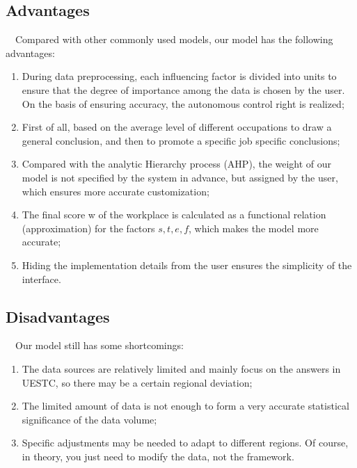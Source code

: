 \documentclass[12pt]{article}
\begin{document}
    \subsection{Advantages}
    ~~Compared with other commonly used models, our model has the following advantages:
    \begin{enumerate}
        \item During data preprocessing, each influencing factor is divided into units to ensure that the degree of importance among the data is chosen by the user. On the basis of ensuring accuracy, the autonomous control right is realized;%
        \item First of all, based on the average level of different occupations to draw a general conclusion, and then to promote a specific job specific conclusions;%
        \item Compared with the analytic Hierarchy process (AHP), the weight of our model is not specified by the system in advance, but assigned by the user, which ensures more accurate customization;%
        \item The final score w of the workplace is calculated as a functional relation (approximation) for the factors $s, t, e, f$, which makes the model more accurate;%
        \item Hiding the implementation details from the user ensures the simplicity of the interface.%
    \end{enumerate}
    \subsection{Disadvantages}
~~Our model still has some shortcomings:
\begin{enumerate}
    \item The data sources are relatively limited and mainly focus on the answers in UESTC, so there may be a certain regional deviation;%
    \item The limited amount of data is not enough to form a very accurate statistical significance of the data volume;%
    \item Specific adjustments may be needed to adapt to different regions. Of course, in theory, you just need to modify the data, not the framework.%
\end{enumerate}
\end{document}
